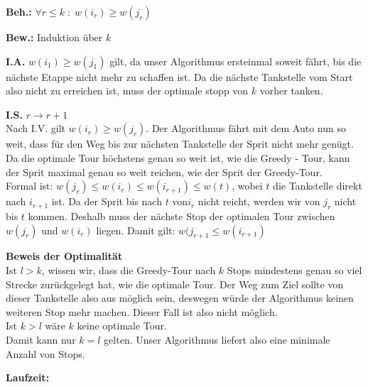 \documentclass[11pt,a4paper,ngerman]{article}
\begin{document}
\begin{description}

\item{\bfseries Beh.:} $\forall r \leq k \; : \; w(i_r) \geq w(j_r)$

\item{\bfseries Bew.:} Induktion über $k$

\item{\bfseries I.A.} $w(i_1) \geq w(j_1)$ gilt, da unser Algorithmus ersteinmal soweit fährt, bis die nächste Etappe nicht mehr zu schaffen ist. Da die nächste Tankstelle vom Start also nicht zu erreichen ist, muss der optimale stopp von $k$ vorher tanken.

\pagebreak

\item{\bfseries I.S.} $r \longrightarrow r + 1$\\
Nach I.V. gilt $w(i_r) \geq w(j_r)$. Der Algorithmus fährt mit dem Auto nun so weit, dass für den Weg bis zur nächsten Tankstelle der Sprit nicht mehr genügt.\\
Da die optimale Tour höchstens genau so weit ist, wie die Greedy - Tour, kann der Sprit maximal genau so weit reichen, wie der Sprit der Greedy-Tour.\\

Formal ist: $w(j_r) \leq w(i_r) \leq w(i_{r+1}) \leq w(t)$, wobei $t$ die Tankstelle direkt nach $i_{r+1}$ ist. Da der Sprit bis nach $t$ von$i_r$ nicht reicht, werden wir von $j_r$ nicht bis $t$ kommen. Deshalb muss der nächste Stop der optimalen Tour zwischen $w(j_r)$ und $w(i_r)$ liegen. Damit gilt: $w(j_{r+1} \leq w(i_{r+1})$

\item{\bfseries Beweis der Optimalität}\\
Ist $l > k$, wissen wir, dass die Greedy-Tour nach $k$ Stops mindestens genau so viel Strecke zurückgelegt hat, wie die optimale Tour. Der Weg zum Ziel sollte von dieser Tankstelle also aus möglich sein, deswegen würde der Algorithmus keinen weiteren Stop mehr machen. Dieser Fall ist also nicht möglich.\\

Ist $k > l$ wäre $k$ keine optimale Tour.\\

Damit kann nur $k =l$ gelten. Unser Algorithmus liefert also eine minimale Anzahl von Stops.
\end{description}

\textbf{Laufzeit:}\\
\end{document}
